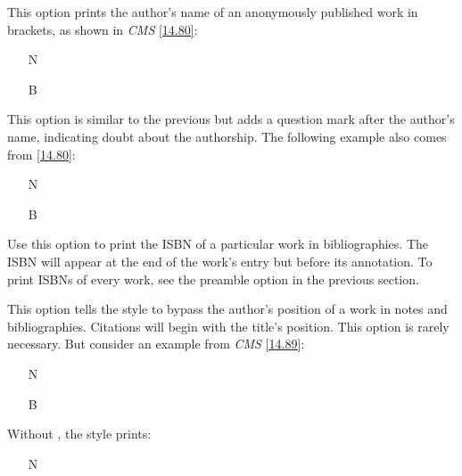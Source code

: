 \documentclass[11pt,letterpaper,oneside]{article}
\begin{document}
\begin{optionlist}


This option prints the author's name of an anonymously published work
in brackets, as shown in \textit{CMS} \ref{14.80}:

\begin{itemize}
\item[N] 

\item[B] 
\end{itemize}


This option is similar to the previous but adds a question mark after
the author's name, indicating doubt about the authorship. The
following example also comes from \ref{14.80}:

\begin{itemize}
\item[N] 

\item[B] 
\end{itemize}


Use this option to print the ISBN of a particular work in
bibliographies. The ISBN will appear at the end of the work's entry
but before its annotation. To print ISBNs of every work, see the
 preamble option in the previous section.


This option tells the style to bypass the author's position of a work
in notes and bibliographies. Citations will begin with the title's
position. This option is rarely necessary. But consider an example
from \textit{CMS} \ref{14.89}:

\begin{itemize}
\item[N] 

\item[B] 
\end{itemize}

\noindent Without , the style prints:

\begin{itemize}
\item[N] 


\end{itemize}
\end{optionlist}
\end{document}
